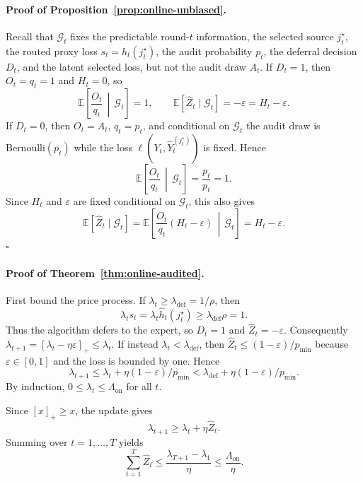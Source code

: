 \documentclass[11pt]{article}
\newcommand{\E}{\mathbb{E}}
\newcommand{\calG}{\mathcal{G}}
\newcommand{\hatY}{\widehat Y}
\newcommand{\hath}{\widehat h}
\newcommand{\eps}{\varepsilon}
\begin{document}
\paragraph{Proof of Proposition~\ref{prop:online-unbiased}.}
Recall that $\calG_t$ fixes the predictable round-$t$ information, the selected
source $j_t^\star$, the routed proxy loss
$s_t=\hath_t(j_t^\star)$, the audit probability $p_t$, the deferral
decision $D_t$, and the latent selected loss, but not the audit draw $A_t$.
If $D_t=1$, then $O_t=q_t=1$ and $H_t=0$, so
\[
    \E\left[\frac{O_t}{q_t}\,\middle|\,\calG_t\right]=1,
    \qquad
    \E[\widehat Z_t\mid\calG_t]=-\eps=H_t-\eps.
\]
If $D_t=0$, then $O_t=A_t$, $q_t=p_t$, and conditional on $\calG_t$ the audit
draw is Bernoulli$(p_t)$ while the loss
$\ell(Y_t,\hatY_t^{(j_t^\star)})$ is fixed.  Hence
\[
    \E\left[
        \frac{O_t}{q_t}
        \,\middle|\,
        \calG_t
    \right]
    =
    \frac{p_t}{p_t}
    =
    1.
\]
Since $H_t$ and $\eps$ are fixed conditional on $\calG_t$, this also gives
\[
    \E[\widehat Z_t\mid\calG_t]
    =
    \E\left[
        \frac{O_t}{q_t}(H_t-\eps)
        \,\middle|\,
        \calG_t
    \right]
    =
    H_t-\eps.
\] \hfill$\square$

\paragraph{Proof of Theorem~\ref{thm:online-audited}.}
First bound the price process.
If $\lambda_t\ge\lambda_{\mathrm{def}}=1/\rho$, then
\[
    \lambda_t s_t
    =
    \lambda_t\hath_t(j_t^\star)
    \ge
    \lambda_{\mathrm{def}}\rho
    =
    1.
\]
Thus the algorithm defers to the expert, so $D_t=1$ and
$\widehat Z_t=-\eps$.
Consequently $\lambda_{t+1}=[\lambda_t-\eta\eps]_+\le\lambda_t$.
If instead $\lambda_t<\lambda_{\mathrm{def}}$, then
$\widehat Z_t\le(1-\eps)/p_{\min}$ because
$\eps\in[0,1]$ and the loss is bounded by one. Hence
\[
    \lambda_{t+1}
    \le
    \lambda_t+\eta(1-\eps)/p_{\min}
    <
    \lambda_{\mathrm{def}}+\eta(1-\eps)/p_{\min}.
\]
By induction, $0\le\lambda_t\le\Lambda_{\mathrm{on}}$ for all $t$.

Since $[x]_+\ge x$, the update gives
\[
    \lambda_{t+1}
    \ge
    \lambda_t+\eta\widehat Z_t.
\]
Summing over $t=1,\ldots,T$ yields
\[
    \sum_{t=1}^T \widehat Z_t
    \le
    \frac{\lambda_{T+1}-\lambda_1}{\eta}
    \le
    \frac{\Lambda_{\mathrm{on}}}{\eta}.
\]
\end{document}
